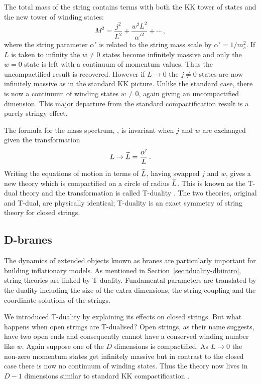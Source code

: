 The total mass of the string contains terms with both the KK tower of states
and the new tower of winding states:
\begin{equation}
\label{eq:closedmass-dbiintro}
 M^2 = \frac{j^2}{L^2} + \frac{w^2 L^2}{\alpha'^2} + \cdots\,,
\end{equation}
where the string parameter $\alpha'$ is related to the string mass scale by
$\alpha'=1/m_s^2$.
If $L$ is taken to infinity the $w\ne 0$ states become infinitely massive and
only the $w=0$ state is left with a continuum of momentum values. Thus the
uncompactified result is recovered. However if $L\rightarrow0$ the $j\ne 0$
states are now infinitely massive as in the standard KK picture. Unlike the
standard case, there is now a continuum of winding states $w\ne 0$,
again giving an
uncompactified dimension. This major departure from the standard
compactification result is a purely stringy effect. 

The formula for the mass spectrum, , is invariant
when $j$ and $w$ are exchanged given the transformation
\begin{equation}
 L \rightarrow \widetilde{L} = \frac{\alpha'}{L}\,.
\end{equation}
Writing the equations of motion in terms of $\widetilde{L}$, having swapped $j$ and
$w$,
gives a new theory
which is compactified on a circle of radius $\widetilde{L}$. This is known as the
T-dual theory and the transformation is called T-duality
\cite{Sakai1986,Kikkawa1984b}. The two
theories,
original and T-dual, are physically identical; T-duality is an exact symmetry
of string theory for closed strings.

% 
\subsection{D-branes}
\label{sec:dbranes-dbiintro}
The dynamics of extended objects known as branes are particularly important for
building inflationary models.
As mentioned in Section~\ref{sec:tduality-dbiintro}, string
theories are linked by T-duality. Fundamental parameters are translated by the
duality including the size of the extra-dimensions, the string coupling and the
coordinate solutions of the strings.


We introduced T-duality by explaining
its effects on closed strings. But what happens when open strings are
T-dualised? Open strings, as their name suggests, have two open ends and
consequently cannot have a conserved winding number like $w$. Again suppose one
of the $D$ dimensions is compactified. As $L\rightarrow0$ the non-zero momentum
states get infinitely massive but in contrast to the closed case there is now
no continuum of winding states. Thus the theory now lives in $D-1$ dimensions
similar to standard KK compactification \cite{Johnson2000}.

